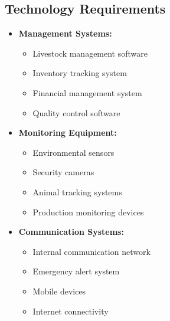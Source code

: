 \subsection{Technology Requirements}
\begin{itemize}
    \item \textbf{Management Systems:}
    \begin{itemize}
        \item Livestock management software
        \item Inventory tracking system
        \item Financial management system
        \item Quality control software
    \end{itemize}
    
    \item \textbf{Monitoring Equipment:}
    \begin{itemize}
        \item Environmental sensors
        \item Security cameras
        \item Animal tracking systems
        \item Production monitoring devices
    \end{itemize}
    
    \item \textbf{Communication Systems:}
    \begin{itemize}
        \item Internal communication network
        \item Emergency alert system
        \item Mobile devices
        \item Internet connectivity
    \end{itemize}
\end{itemize}
